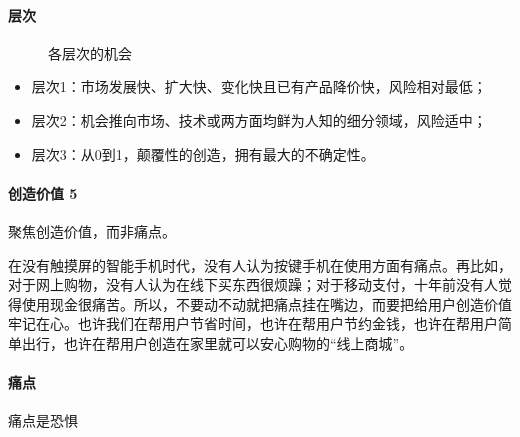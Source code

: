 \documentclass[letterpaper,10pt,english]{sphinxmanual}
\begin{document}
\paragraph{层次}
\label{\detokenize{chapter_introduction/opportunity:id2}}
\begin{figure}[H]
\centering
\capstart

\noindent{}
\caption{各层次的机会\sphinxfootnotemark[255]}\label{\detokenize{chapter_introduction/opportunity:id12}}\end{figure}
%
\begin{footnotetext}[255]\sphinxAtStartFootnote
{}
%
\end{footnotetext}\ignorespaces \begin{itemize}
\item {} 
层次1：市场发展快、扩大快、变化快且已有产品降价快，风险相对最低；

\item {} 
层次2：机会推向市场、技术或两方面均鲜为人知的细分领域，风险适中；

\item {} 
层次3：从0到1，颠覆性的创造，拥有最大的不确定性。

\end{itemize}


\paragraph{创造价值 5\sphinxfootnotemark[256]}
\label{\detokenize{chapter_introduction/opportunity:id3}}%
\begin{footnotetext}[256]\sphinxAtStartFootnote
{}
%
\end{footnotetext}\ignorespaces 
聚焦创造价值，而非痛点。

在没有触摸屏的智能手机时代，没有人认为按键手机在使用方面有痛点。再比如，对于网上购物，没有人认为在线下买东西很烦躁；对于移动支付，十年前没有人觉得使用现金很痛苦。所以，不要动不动就把痛点挂在嘴边，而要把给用户创造价值牢记在心。也许我们在帮用户节省时间，也许在帮用户节约金钱，也许在帮用户简单出行，也许在帮用户创造在家里就可以安心购物的“线上商城”。


\paragraph{痛点}
\label{\detokenize{chapter_introduction/opportunity:id4}}
痛点是恐惧
\end{document}
